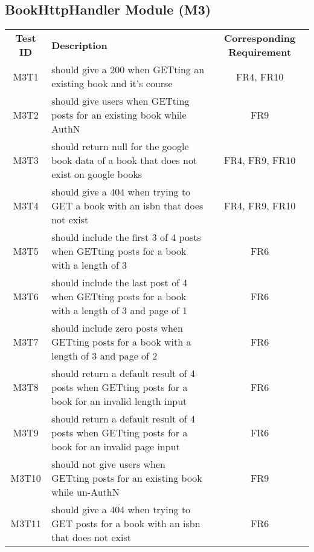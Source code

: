 \documentclass[fullpage]{article}
\begin{document}
\begin{table}[H]
\begin{tabular}{|c|p{8.5cm}|p{5cm}|}
\end{tabular}
\end{table}

\subsection{BookHttpHandler Module (M3)}
\begin{table}[H]
\flushleft
\begin{tabular}{|c|p{8.5cm}|c|}
\hline
 \rowcolor{lightgray} 
\textbf{Test ID} &\textbf{Description} &\textbf{Corresponding Requirement}\\
M3T1 & should give a 200 when GETting an existing book and it's course & FR4, FR10 \\
\hline
M3T2 & should give users when GETting posts for an existing book while AuthN & FR9 \\
\hline
M3T3 & should return null for the google book data of a book that does not exist on google books & FR4, FR9, FR10 \\
\hline
M3T4 & should give a 404 when trying to GET a book with an isbn that does not exist & FR4, FR9, FR10 \\
\hline
M3T5 & should include the first 3 of 4 posts when GETting posts for a book with a length of 3 & FR6 \\
\hline
M3T6 & should include the last post of 4 when GETting posts for a book with a length of 3 and page of 1 & FR6 \\
\hline
M3T7 & should include zero posts when GETting posts for a book with a length of 3 and page of 2 & FR6 \\
\hline
M3T8 & should return a default result of 4 posts when GETting posts for a book for an invalid length input & FR6 \\
\hline
M3T9 & should return a default result of 4 posts when GETting posts for a book for an invalid page input & FR6 \\
\hline
M3T10 & should not give users when GETting posts for an existing book while un-AuthN & FR9 \\
\hline
M3T11 & should give a 404 when trying to GET posts for a book with an isbn that does not exist & FR6 \\
\hline
\end{tabular}
\end{table}
\end{document}
